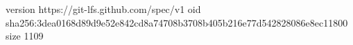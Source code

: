 version https://git-lfs.github.com/spec/v1
oid sha256:3dea0168d89d9e52e842cd8a74708b3708b405b216e77d542828086e8ec11800
size 1109
